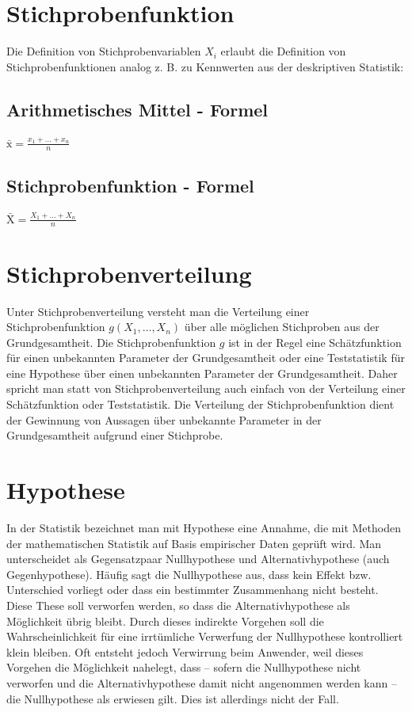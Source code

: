 \section{Stichprobenfunktion}
Die Definition von Stichprobenvariablen ${\displaystyle X_{i}}$ erlaubt die Definition von Stichprobenfunktionen analog z. B. zu Kennwerten aus der deskriptiven Statistik:
\subsection{Arithmetisches Mittel - Formel}
{\Large{$\bar{\mathrm{x}} = \frac{x_1 + \ldots + x_n}{n}$}}
\subsection{Stichprobenfunktion - Formel}
{\Large{$\bar{\mathrm{X}} = \frac{X_1 + \ldots + X_n}{n}$}}

\section{Stichprobenverteilung}
Unter Stichprobenverteilung versteht man die Verteilung einer Stichprobenfunktion ${\displaystyle g(X_{1},\dotsc ,X_{n})}$ über alle möglichen Stichproben aus der Grundgesamtheit. Die Stichprobenfunktion ${\displaystyle g}$ ist in der Regel eine Schätzfunktion für einen unbekannten Parameter der Grundgesamtheit oder eine Teststatistik für eine Hypothese über einen unbekannten Parameter der Grundgesamtheit. Daher spricht man statt von Stichprobenverteilung auch einfach von der Verteilung einer Schätzfunktion oder Teststatistik. Die Verteilung der Stichprobenfunktion dient der Gewinnung von Aussagen über unbekannte Parameter in der Grundgesamtheit aufgrund einer Stichprobe.

\section{Hypothese}
In der Statistik bezeichnet man mit Hypothese eine Annahme, die mit Methoden der mathematischen Statistik auf Basis empirischer Daten geprüft wird. Man unterscheidet als Gegensatzpaar Nullhypothese und Alternativhypothese (auch Gegenhypothese). Häufig sagt die Nullhypothese aus, dass kein Effekt bzw. Unterschied vorliegt oder dass ein bestimmter Zusammenhang nicht besteht. Diese These soll verworfen werden, so dass die Alternativhypothese als Möglichkeit übrig bleibt. Durch dieses indirekte Vorgehen soll die Wahrscheinlichkeit für eine irrtümliche Verwerfung der Nullhypothese kontrolliert klein bleiben. Oft entsteht jedoch Verwirrung beim Anwender, weil dieses Vorgehen die Möglichkeit nahelegt, dass – sofern die Nullhypothese nicht verworfen und die Alternativhypothese damit nicht angenommen werden kann – die Nullhypothese als erwiesen gilt. Dies ist allerdings nicht der Fall.
